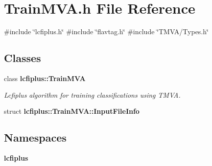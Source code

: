 \section{Train\+M\+V\+A.\+h File Reference}
\label{TrainMVA_8h}
{\ttfamily \#include \char`\"{}lcfiplus.\+h\char`\"{}}\newline
{\ttfamily \#include \char`\"{}flavtag.\+h\char`\"{}}\newline
{\ttfamily \#include \char`\"{}T\+M\+V\+A/\+Types.\+h\char`\"{}}\newline
\subsection*{Classes}
\begin{DoxyCompactItemize}
\item 
class \textbf{ lcfiplus\+::\+Train\+M\+VA}
\begin{DoxyCompactList}\small\item\em Lcfiplus algorithm for training classifications using T\+M\+VA. \end{DoxyCompactList}\item 
struct \textbf{ lcfiplus\+::\+Train\+M\+V\+A\+::\+Input\+File\+Info}
\end{DoxyCompactItemize}
\subsection*{Namespaces}
\begin{DoxyCompactItemize}
\item 
 \textbf{ lcfiplus}
\end{DoxyCompactItemize}
